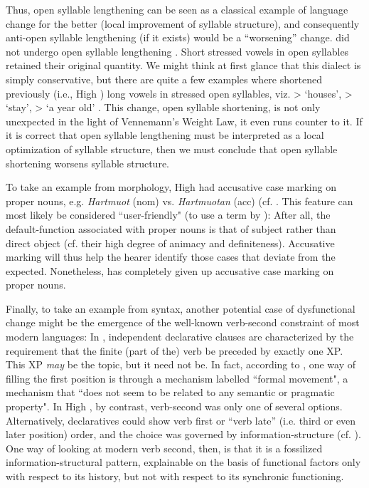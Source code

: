 \documentclass[output=paper,colorlinks,citecolor=brown]{langscibook}
\begin{document}
Thus, open syllable lengthening can be seen as a classical example of language change for the better (local improvement of syllable structure), and consequently anti-open syllable lengthening (if it exists) would be a ``worsening'' change.    did not undergo open syllable lengthening \citep{Seiler_2005}. Short stressed vowels in open syllables retained their original quantity. We might think at first glance that this dialect is simply conservative, but there are quite a few examples where  shortened previously (i.e.,  High ) long vowels in stressed open syllables, viz. 
\textipa{["hy:.s@r]} > \textipa{["hY.\r*z@r]} `houses', 
\textipa{["bli:.b@n]} > \textipa{["\r*blI.\r*b@]} `stay',
 > \textipa{["\textsubarch{I}\ae{}.rI\r*g]} `a year old'
\citep[477]{Seiler_2005}. This change, open syllable shortening, is not only unexpected in the light of Vennemann's Weight Law, it even runs counter to it. If it is correct that open syllable lengthening must be interpreted as a local optimization of syllable structure, then we must conclude that  open syllable shortening worsens syllable structure.

To take an example from morphology,  High  had accusative case marking on proper nouns, e.g. \textit{Hartmuot} (nom) vs.  \textit{Hartmuotan} (acc) (cf. \citealt[186--187]{Braune_2004}. This feature can most likely be considered ``user-friendly" (to use a term by \citealt[191]{Haspelmath_1999}): After all, the default-function associated with proper nouns is that of subject rather than direct object (cf. their high degree of animacy and definiteness). Accusative marking will thus help the hearer identify those cases that deviate from the expected. Nonetheless,   has completely given up accusative case marking on proper nouns.

Finally, to take an example from syntax, another potential case of dysfunctional change might be the emergence of the well-known verb-second constraint of most modern  languages: In  , independent declarative clauses are characterized by the requirement that the finite (part of the) verb be preceded by exactly one XP. This XP \textit{may} be the topic, but it need not be. In fact, according to \citet[9]{Frey_2004}, one way of filling the first position is through a mechanism labelled ``formal movement", a mechanism that ``does not seem to be related to any semantic or pragmatic property". In  High , by contrast, verb-second was only one of several options. Alternatively, declaratives could show verb first or ``verb late'' (i.e. third or even later position) order, and the choice was governed by information-structure (cf. \citealt{HinterhölzlPetrova_2010, HinterhölzlPetrova_2011}). One way of looking at modern verb second, then, is that it is a fossilized information-structural pattern, explainable on the basis of functional factors only with respect to its history, but not with respect to its synchronic functioning.
\end{document}
